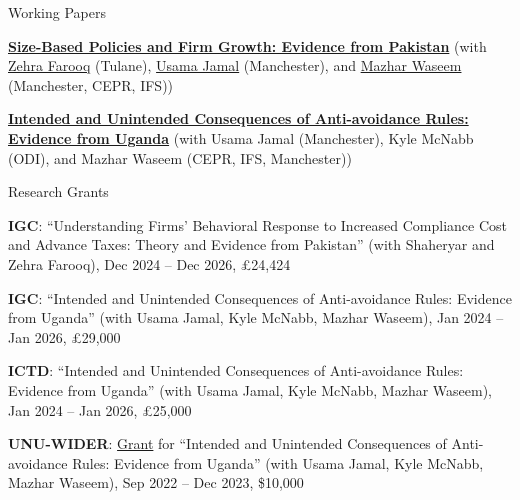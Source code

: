 \documentclass{../resume}
\begin{document}
\begin{rSection}{Working Papers}
\vspace{-0.5cm}
\item \href{https://bashirmohammad.github.io/files/PAK_VAT_Threshold_October_2024.pdf}{\textbf{Size-Based Policies and Firm Growth: Evidence from Pakistan}} (with \href{https://www.zehrafarooq.com}{Zehra Farooq} (Tulane), \href{https://research.manchester.ac.uk/en/persons/usama.jamal}{Usama Jamal} (Manchester), and \href{https://mazharwaseem.com/}{Mazhar Waseem} (Manchester, CEPR, IFS))
\item \href{https://bashirmohammad.github.io/files/URA_ProfitShifting_October2024.pdf}{\textbf{Intended and Unintended Consequences of Anti-avoidance Rules: Evidence from Uganda}} (with Usama Jamal (Manchester), Kyle McNabb (ODI), and Mazhar Waseem (CEPR, IFS, Manchester))
\end{rSection}

\begin{rSection}{Research Grants}
\vspace{-0.5cm}
\item \textbf{IGC}: ``Understanding Firms' Behavioral Response to Increased Compliance Cost and Advance Taxes: Theory and Evidence from Pakistan'' (with Shaheryar and Zehra Farooq), Dec 2024 -- Dec 2026, \pounds 24,424
\item \textbf{IGC}: ``Intended and Unintended Consequences of Anti-avoidance Rules: Evidence from Uganda'' (with Usama Jamal, Kyle McNabb, Mazhar Waseem), Jan 2024 -- Jan 2026, \pounds 29,000
\item \textbf{ICTD}: ``Intended and Unintended Consequences of Anti-avoidance Rules: Evidence from Uganda'' (with Usama Jamal, Kyle McNabb, Mazhar Waseem), Jan 2024 -- Jan 2026, \pounds 25,000
\item \textbf{UNU-WIDER}: \href{https://www.wider.unu.edu/opportunity/analysis-firms-and-taxation-using-micro-data-uganda}{Grant} for ``Intended and Unintended Consequences of Anti-avoidance Rules: Evidence from Uganda'' (with Usama Jamal, Kyle McNabb, Mazhar Waseem), Sep 2022 -- Dec 2023, \$10,000
\end{rSection}
\end{document}
